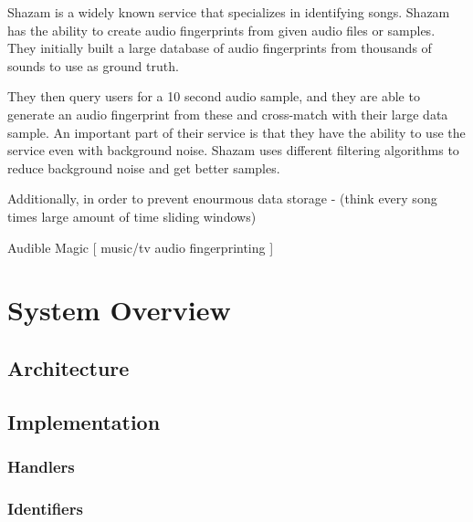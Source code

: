 \documentclass[paper=a4, fontsize=11pt]{scrartcl} %
\numberwithin{equation}{section} %
\numberwithin{figure}{section} %
\numberwithin{table}{section} %
\begin{document}
Shazam is a widely known service that specializes in identifying songs. Shazam has the ability to create audio fingerprints from given audio files or samples. They initially built a large database of audio fingerprints from thousands of sounds to use as ground truth. 

They then query users for a 10 second audio sample, and they are able to generate an audio fingerprint from these and cross-match with their large data sample. An important part of their service is that they have the ability to use the service even with background noise. Shazam uses different filtering algorithms to reduce background noise and get better samples. 

Additionally, in order to prevent enourmous data storage - (think every song times large amount of time sliding windows) 

Audible Magic [ music/tv audio fingerprinting ]




\section{System Overview}
\label{sec:system-overview}



\subsection{Architecture}
\label{sec:architecture}


\subsection{Implementation}
\label{sec:implementation}

\subsubsection{Handlers}
\label{sec:handlers}

\subsubsection{Identifiers}
\label{sec:identifiers}

\end{document}
